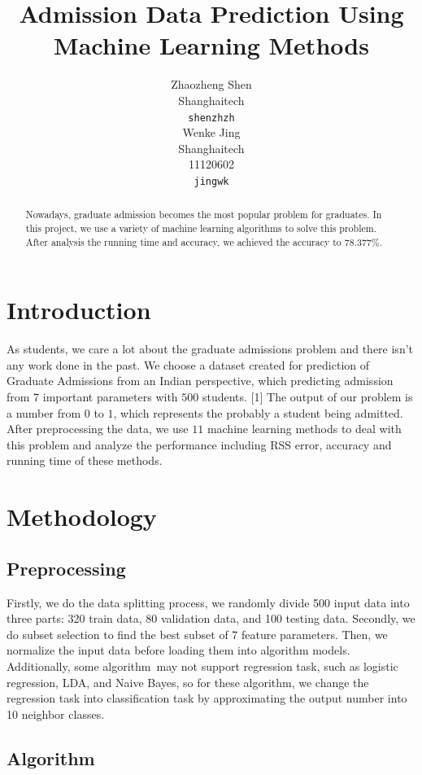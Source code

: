 \documentclass{article}
\title{Admission Data Prediction Using Machine Learning Methods}
\author{
  Zhaozheng Shen\\ 
Shanghaitech \\
\texttt{shenzhzh} \\
\AND
Wenke Jing \\
Shanghaitech \\
11120602\\
\texttt{jingwk} \\
}
\begin{document}
\maketitle

\begin{abstract}
Nowadays, graduate admission becomes the most popular problem for graduates. In this project, we use a variety of machine learning algorithms to solve this problem. After analysis the running time and accuracy, we achieved the accuracy to $78.377\%$.
\end{abstract}

\section{Introduction}
As students, we care a lot about the graduate admissions problem and there isn't any work done in the past. We choose a dataset created for prediction of Graduate Admissions from an Indian perspective, which predicting admission from $7$ important parameters with $500$ students. [1] The output of our problem is a number from $0$ to $1$, which represents the probably a student being admitted. After preprocessing the data, we use $11$ machine learning methods to deal with this problem and analyze the performance including RSS error, accuracy and running time of these methods.

\section{Methodology}

\subsection{Preprocessing}
Firstly, we do the data splitting process, we randomly divide 500 input data into three parts: 320 train data, 80 validation data, and 100 testing data.
Secondly, we do subset selection to find the best subset of 7 feature parameters. Then, we normalize the input data before loading them into algorithm models.
Additionally, some algorithm may not support regression task, such as logistic regression, LDA, and Naive Bayes, so for these algorithm, we change the regression task into classification task by approximating the output number into 10 neighbor classes.

\subsection{Algorithm}
\end{document}
